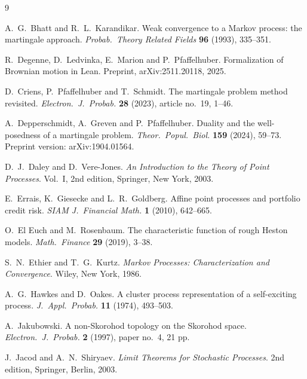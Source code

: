 \documentclass[11pt,a4paper]{article}
\theoremstyle{plain}
\theoremstyle{definition}
\theoremstyle{remark}
\begin{document}
\begin{thebibliography}{9}

A.~G.~Bhatt and R.~L.~Karandikar.
\newblock Weak convergence to a Markov process: the martingale approach.
\newblock \emph{Probab.\ Theory Related Fields} \textbf{96} (1993), 335--351.

R.~Degenne, D.~Ledvinka, E.~Marion and P.~Pfaffelhuber.
\newblock Formalization of Brownian motion in Lean.
\newblock Preprint, arXiv:2511.20118, 2025.

D.~Criens, P.~Pfaffelhuber and T.~Schmidt.
\newblock The martingale problem method revisited.
\newblock \emph{Electron.\ J.\ Probab.} \textbf{28} (2023), article no.~19, 1--46.

A.~Depperschmidt, A.~Greven and P.~Pfaffelhuber.
\newblock Duality and the well-posedness of a martingale problem.
\newblock \emph{Theor.\ Popul.\ Biol.} \textbf{159} (2024), 59--73.
\newblock Preprint version: arXiv:1904.01564.

D.~J.~Daley and D.~Vere-Jones.
\newblock \emph{An Introduction to the Theory of Point Processes}.
\newblock Vol.~I, 2nd edition, Springer, New York, 2003.

E.~Errais, K.~Giesecke and L.~R.~Goldberg.
\newblock Affine point processes and portfolio credit risk.
\newblock \emph{SIAM J.\ Financial Math.} \textbf{1} (2010), 642--665.

O.~El Euch and M.~Rosenbaum.
\newblock The characteristic function of rough Heston models.
\newblock \emph{Math.\ Finance} \textbf{29} (2019), 3--38.

S.~N.~Ethier and T.~G.~Kurtz.
\newblock \emph{Markov Processes: Characterization and Convergence}.
\newblock Wiley, New York, 1986.

A.~G.~Hawkes and D.~Oakes.
\newblock A cluster process representation of a self-exciting process.
\newblock \emph{J.\ Appl.\ Probab.} \textbf{11} (1974), 493--503.

A.~Jakubowski.
\newblock A non-Skorohod topology on the Skorohod space.
\newblock \emph{Electron.\ J.\ Probab.} \textbf{2} (1997), paper no.~4, 21 pp.

J.~Jacod and A.~N.~Shiryaev.
\newblock \emph{Limit Theorems for Stochastic Processes}.
\newblock 2nd edition, Springer, Berlin, 2003.


\end{thebibliography}
\end{document}
